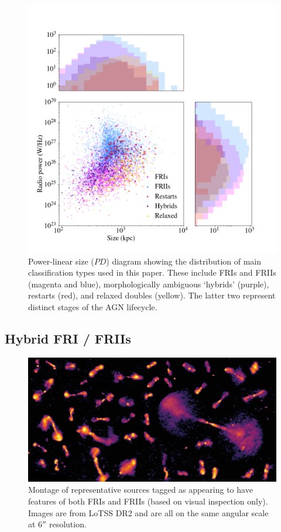 \documentclass{aa}
\begin{document}
\begin{figure}
\includegraphics[width=1\linewidth]{Images/galaxies/main_classification_types_largefont2024.png}
\caption{Power-linear size ($PD$) diagram showing the distribution of main classification types used in this paper. These include FRIs and FRIIs (magenta and blue), morphologically ambiguous `hybrids' (purple), restarts (red), and relaxed doubles (yellow). The latter two represent distinct stages of the AGN lifecycle.}
\label{fig:scatter_fris_friis.png}
\end{figure}

\subsection{Hybrid FRI / FRIIs}
\label{sec:hybrid}
\begin{figure}
\includegraphics[width=1\linewidth]{Images/galaxies/hybrids.png}
\caption{Montage of representative sources tagged as appearing to have features of both FRIs and FRIIs (based on visual inspection only). Images are from LoTSS DR2 and are all on the same angular scale at $6''$ resolution.}
\label{fig:hybrids.png}
\end{figure}
\end{document}
